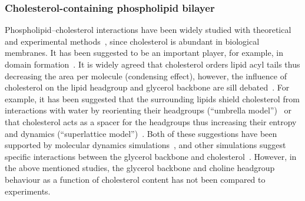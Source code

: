 \documentclass[journal=jacsat,manuscript=article]{achemso}
\begin{document}
\subsubsection{Cholesterol-containing phospholipid bilayer}
Phospholipid--cholesterol interactions have been widely studied with theoretical~\cite{huang99,zhu07,rog09,alwarawrah12} and
experimental methods~\cite{brown78,marsh10,ferreira13,marsh13}, since cholesterol is abundant in biological membranes.
It has been suggested to be an important player, for example, in domain formation~\cite{simons04,somerharju09}.
It is widely agreed that cholesterol orders lipid acyl tails thus decreasing the area per molecule (condensing effect),
however, the influence of cholesterol on the lipid headgroup and glycerol backbone are sill debated~\cite{huang99,simons04,somerharju09}.
For example, it has been suggested that the surrounding lipids shield cholesterol from interactions with water by 
reorienting their headgroups (``umbrella model'')~\cite{huang99} or that cholesterol acts as a spacer for the headgroups thus increasing 
their entropy and dynamics (``superlattice model'')~\cite{somerharju09}. 
Both of these suggestions have been supported
by molecular dynamics simulations~\cite{zhu07,alwarawrah12}, and other simulations suggest specific
interactions between the glycerol backbone and cholesterol~\cite{rog09}. However,
in the above mentioned studies, the glycerol backbone and choline headgroup behaviour
as a function of cholesterol content has not been compared to experiments. 
\end{document}
